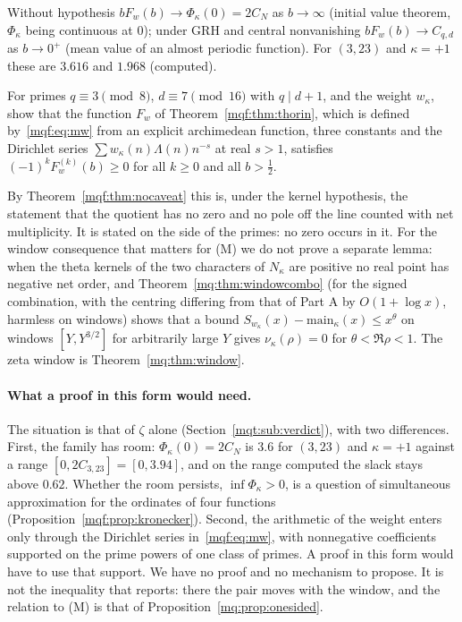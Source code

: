 Without hypothesis $bF_w(b)\to\Phi_\kappa(0)=2C_N$ as $b\to\infty$ (initial value theorem, $\Phi_\kappa$ being continuous at $0$); under GRH and central nonvanishing $bF_w(b)\to C_{q,d}$ as $b\to0^+$ (mean value of an almost periodic function). For $(3,23)$ and $\kappa=+1$ these are $3.616$ and $1.968$ (computed).

\begin{problem}\label{mqf:prob:thorin}
For primes $q\equiv3\pmod8$, $d\equiv7\pmod{16}$ with $q\mid d+1$, and the weight $w_\kappa$, show that the function $F_w$ of Theorem~\ref{mqf:thm:thorin}, which is defined by~\eqref{mqf:eq:mw} from an explicit archimedean function, three constants and the Dirichlet series $\sum w_\kappa(n)\Lambda(n)n^{-s}$ at real $s>1$, satisfies $(-1)^kF_w^{(k)}(b)\ge0$ for all $k\ge0$ and all $b>\frac12$.
\end{problem}

By Theorem~\ref{mqf:thm:nocaveat} this is, under the kernel hypothesis, the statement that the quotient has no zero and no pole off the line counted with net multiplicity. It is stated on the side of the primes: no zero occurs in it. For the window consequence that matters for (M) we do not prove a separate lemma: when the theta kernels of the two characters of $N_\kappa$ are positive no real point has negative net order, and Theorem~\ref{mq:thm:windowcombo} (for the signed combination, with the centring differing from that of Part A by $O(1+\log x)$, harmless on windows) shows that a bound $S_{w_\kappa}(x)-\mathrm{main}_\kappa(x)\le x^\theta$ on windows $[Y,Y^{3/2}]$ for arbitrarily large $Y$ gives $\nu_\kappa(\rho)=0$ for $\theta<\Re\rho<1$. The zeta window is Theorem~\ref{mq:thm:window}.

\paragraph{What a proof in this form would need.} The situation is that of $\zeta$ alone (Section~\ref{mqt:sub:verdict}), with two differences. First, the family has room: $\Phi_\kappa(0)=2C_N$ is $3.6$ for $(3,23)$ and $\kappa=+1$ against a range $[0,2C_{3,23}]=[0,3.94]$, and on the range computed the slack stays above $0.62$. Whether the room persists, $\inf\Phi_\kappa>0$, is a question of simultaneous approximation for the ordinates of four functions (Proposition~\ref{mqf:prop:kronecker}). Second, the arithmetic of the weight enters only through the Dirichlet series in~\eqref{mqf:eq:mw}, with nonnegative coefficients supported on the prime powers of one class of primes. A proof in this form would have to use that support. We have no proof and no mechanism to propose. It is not the inequality that \cite{Rub26} reports: there the pair moves with the window, and the relation to (M) is that of Proposition~\ref{mq:prop:onesided}.

